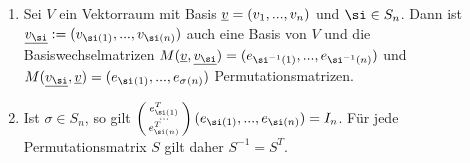 \documentclass[../../main.tex]{subfiles}
\begin{document}
\begin{bem}\label{13.5.6}
\begin{enumerate}[\normalfont(a)]
\item Sei $V$ ein Vektorraum mit Basis ${\underline v}=(v_1,...,v_n)$ und $\si\in S_n$. Dann ist $\underline{v_{\si}}:=(v_{\si(1)},...,v_{\si(n)})$ auch eine Basis von $V$ und die Basiswechselmatrizen $M(\underline{v},\underline{v_{\si}})=(e_{\si^{-1}(1)},...,e_{\si^{-1}(n)})$ und $M(\underline{v_{\si}},\v)=(e_{\si^{}(1)},...,e_{\sigma^{}(n)})$ Permutationsmatrizen.
\item Ist $\sigma\in S_n$, so gilt $\cvec{e^T_{\si(1)}\\...\\ e^T_{\si(n)}}(e_{\si(1)},...,e_{\si(n)})=I_n$. Für jede Permutationsmatrix $S$ gilt daher $S^{-1}=S^T$.
\end{enumerate}
\end{bem}
\end{document}
